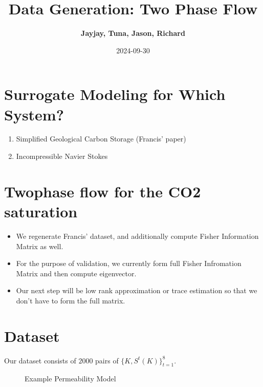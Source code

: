 \documentclass[
]{article}
\title{Data Generation: Two Phase Flow}
\author{\textbf{Jayjay, Tuna, Jason, Richard}\\}
\date{2024-09-30}
\providecommand{\tightlist}{%
  \setlength{\itemsep}{0pt}\setlength{\parskip}{0pt}}\usepackage{longtable,booktabs,array}
\begin{document}
\maketitle


\section{Surrogate Modeling for Which
System?}\label{surrogate-modeling-for-which-system}

\begin{enumerate}
\def\labelenumi{\arabic{enumi}.}
\tightlist
\item
  Simplified Geological Carbon Storage (Francis' paper)
\item
  Incompressible Navier Stokes
\end{enumerate}

\section{Twophase flow for the CO2
saturation}\label{twophase-flow-for-the-co2-saturation}

\begin{itemize}
\tightlist
\item
  We regenerate Francis' dataset, and additionally compute Fisher
  Information Matrix as well.
\item
  For the purpose of validation, we currently form full Fisher
  Infromation Matrix and then compute eigenvector.
\item
  Our next step will be low rank approximation or trace estimation so
  that we don't have to form the full matrix.
\end{itemize}

\section{Dataset}\label{dataset}

Our dataset consists of \(2000\) pairs of \(\{K, S^t(K)\}_{t=1}^8\).

\begin{figure}

\begin{minipage}{0.50\linewidth}



\end{minipage}%
%
\begin{minipage}{0.50\linewidth}



\end{minipage}%

\caption{\label{fig-K}Example Permeability Model}

\end{figure}%
\end{document}
